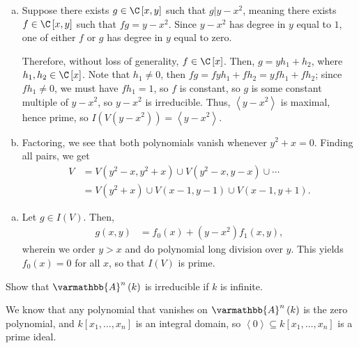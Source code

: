 \documentclass[10pt]{mypackage}
\renewcommand*{\mathbb}[1]{\varmathbb{#1}}
\newcommand{\A}{\mathbb{A}}
\begin{document}
\begin{solution}\hfill
  \begin{enumerate}[(a)]
    \item Suppose there exists $g\in \C\left[ x,y \right]$ such that $g | y-x^2$, meaning there exists $f\in \C\left[ x,y \right]$ such that $fg = y-x^2$. Since $y-x^2$ has degree in $y$ equal to $1$, one of either $f$ or $g$ has degree in $y$ equal to zero.\newline

      Therefore, without loss of generality, $f\in \C\left[ x \right]$. Then, $g = yh_1 + h_2$, where $h_1,h_2\in \C\left[ x \right]$. Note that $h_1\neq 0$, then $fg = fyh_1 + fh_2 = yfh_1 + fh_2$; since $fh_1\neq 0$, we must have $fh_1 = 1$, so $f$ is constant, so $g$ is some constant multiple of $y-x^2$, so $y-x^2$ is irreducible. Thus, $\left\langle y-x^2 \right\rangle$ is maximal, hence prime, so $I\left( V\left( y-x^2 \right) \right) = \left\langle y-x^2 \right\rangle$.
    \item Factoring, we see that both polynomials vanish whenever $y^2 + x = 0$. Finding all pairs, we get
      \begin{align*}
        V &= V\left( y^2-x,y^2 + x \right) \cup V\left( y^2- x,y-x \right) \cup \cdots\\
          &= V\left( y^2 + x \right) \cup V\left( x-1,y-1 \right) \cup V\left( x-1,y+1 \right).
      \end{align*}
  \end{enumerate}
\end{solution}
\begin{solution}\hfill
  \color{red}
  \begin{enumerate}[(a)]
    \item Let $g\in I(V)$. Then,
      \begin{align*}
        g(x,y) &= f_0\left( x \right) + \left( y-x^2 \right)f_1\left( x,y \right),
      \end{align*}
      wherein we order $y > x$ and do polynomial long division over $y$. This yields $f_0(x) = 0$ for all $x$, so that $I\left( V \right)$ is prime.
  \end{enumerate}
\end{solution}

\begin{exercise}[Exercise 1.29]
  Show that $\A^n\left( k \right)$ is irreducible if $k$ is infinite.
\end{exercise}
\begin{solution}
  We know that any polynomial that vanishes on $\A^n\left( k \right)$ is the zero polynomial, and $k\left[ x_1,\dots,x_n \right]$ is an integral domain, so $\left\langle 0 \right\rangle\subseteq k\left[ x_1,\dots,x_n \right]$ is a prime ideal.
\end{solution}
\end{document}
